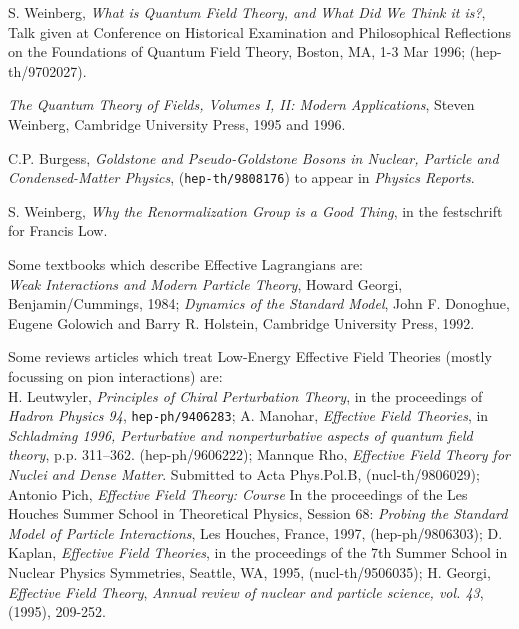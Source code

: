 \begin{thebibliography}{99}
%
S. Weinberg, {\sl What is Quantum Field Theory, 
and What Did We Think it is?}, Talk given at Conference 
on Historical Examination and Philosophical Reflections on the
Foundations of Quantum Field Theory, Boston, MA, 1-3 Mar 1996;
(hep-th/9702027).

{\it The Quantum Theory of Fields, Volumes I,  II: Modern Applications}, 
Steven Weinberg,  Cambridge University Press, 1995 and 1996.

C.P. Burgess, {\sl Goldstone and Pseudo-Goldstone Bosons in 
Nuclear, Particle and Condensed-Matter Physics}, ({\tt hep-th/9808176})
to appear in {\it Physics Reports}.

S. Weinberg, {\sl Why the Renormalization Group is a Good
Thing}, in the festschrift for Francis Low.

Some textbooks which describe Effective Lagrangians are:\\
{\it Weak Interactions and Modern Particle Theory}, Howard Georgi,
Benjamin/Cummings, 1984;
{\it Dynamics of the Standard Model}, 
John F. Donoghue, Eugene Golowich and
Barry R. Holstein, Cambridge University Press, 1992.

Some reviews articles which treat Low-Energy Effective Field
Theories (mostly focussing on pion interactions) are:\\
H. Leutwyler, {\sl Principles of Chiral Perturbation Theory},
in the proceedings of {\it Hadron Physics 94}, {\tt hep-ph/9406283};
A. Manohar, {\sl Effective Field Theories},  in {\it Schladming 1996,
Perturbative and nonperturbative  aspects of quantum field theory}, p.p.
311--362. (hep-ph/9606222);
Mannque Rho, {\sl Effective Field Theory for Nuclei and Dense Matter}.
Submitted to Acta Phys.Pol.B, (nucl-th/9806029);
Antonio Pich, {\sl Effective Field Theory: Course} In the proceedings of the
Les Houches Summer School in Theoretical Physics,
Session 68: {\it Probing the Standard Model of Particle Interactions},
Les Houches, France, 1997, (hep-ph/9806303);
D. Kaplan, {\sl Effective Field Theories}, in the proceedings of the 7th Summer
School in Nuclear Physics
Symmetries, Seattle, WA, 1995, (nucl-th/9506035);
H. Georgi, {\sl Effective Field Theory},
{\it Annual review of nuclear and particle science, vol. 43},
(1995), 209-252.


\end{thebibliography}
